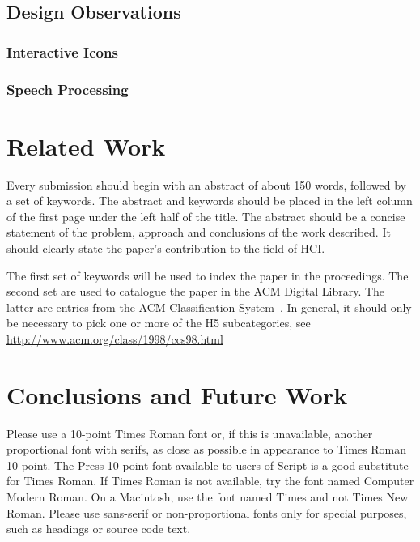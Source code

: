 \documentclass{sigchi}
\begin{document}
\subsection{Design Observations}

\subsubsection{Interactive Icons}

\subsubsection{Speech Processing}

\section{Related Work}

Every submission should begin with an abstract of about 150 words,
followed by a set of keywords. The abstract and keywords should be
placed in the left column of the first page under the left half of the
title. The abstract should be a concise statement of the problem,
approach and conclusions of the work described.  It should clearly
state the paper's contribution to the field of HCI.

The first set of keywords will be used to index the paper in the
proceedings. The second set are used to catalogue the paper in the ACM
Digital Library. The latter are entries from the ACM Classification
System~\cite{acm_categories}.  In general, it should only be necessary
to pick one or more of the H5 subcategories, see
\url{http://www.acm.org/class/1998/ccs98.html}

\section{Conclusions and Future Work}

Please use a 10-point Times Roman font or, if this is unavailable,
another proportional font with serifs, as close as possible in
appearance to Times Roman 10-point. The Press 10-point font available
to users of Script is a good substitute for Times Roman. If Times
Roman is not available, try the font named Computer Modern Roman. On a
Macintosh, use the font named Times and not Times New Roman. Please
use sans-serif or non-proportional fonts only for special purposes,
such as headings or source code text.
\end{document}
